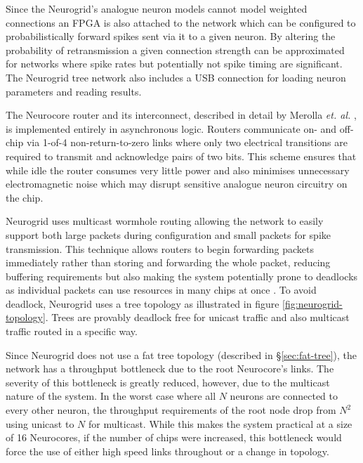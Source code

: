 				Since the Neurogrid's analogue neuron models cannot model weighted
				connections an FPGA is also attached to the network which can be
				configured to probabilistically forward spikes sent via it to a given
				neuron. By altering the probability of retransmission a given connection
				strength can be approximated for networks where spike rates but
				potentially not spike timing are significant.  The Neurogrid tree
				network also includes a USB connection for loading neuron parameters and
				reading results. 
				
				The Neurocore router and its interconnect, described in detail by
				Merolla \emph{et. al.} \cite{merolla14}, is implemented entirely in
				asynchronous logic. Routers communicate on- and off-chip via 1-of-4
				non-return-to-zero links where only two electrical transitions are
				required to transmit and acknowledge pairs of two bits. This scheme
				ensures that while idle the router consumes very little power and also
				minimises unnecessary electromagnetic noise which may disrupt sensitive
				analogue neuron circuitry on the chip.
				
				Neurogrid uses multicast wormhole routing allowing the network to easily
				support both large packets during configuration and small packets for
				spike transmission. This technique allows routers to begin forwarding
				packets immediately rather than storing and forwarding the whole packet,
				reducing buffering requirements but also making the system potentially
				prone to deadlocks as individual packets can use resources in many chips
				at once \cite{dally04}. To avoid deadlock, Neurogrid uses a tree
				topology as illustrated in figure \ref{fig:neurogrid-topology}. Trees
				are provably deadlock free for unicast traffic and also multicast
				traffic routed in a specific way.
				
				Since Neurogrid does not use a fat tree topology (described in
				\S\ref{sec:fat-tree}), the network has a throughput bottleneck due to
				the root Neurocore's links. The severity of this bottleneck is greatly
				reduced, however, due to the multicast nature of the system. In the
				worst case where all $N$ neurons are connected to every other neuron,
				the throughput requirements of the root node drop from $N^2$ using
				unicast to $N$ for multicast. While this makes the system practical at a
				size of 16 Neurocores, if the number of chips were increased, this
				bottleneck would force the use of either high speed links throughout or
				a change in topology.
			
